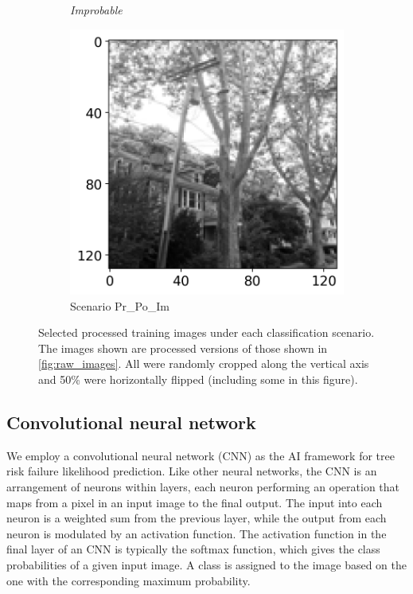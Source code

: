\documentclass[NewProceedindgs, NoLineNumbers, SectionNumbers, letterpaper, SingleSpace, InsideFigs]{ascelike-new}
\begin{document}
\begin{figure}[h!]
\begin{subfigure}[b]{.24\linewidth}
    \textit{\footnotesize Improbable}
    
    \includegraphics[width=\textwidth]{processed-improbable-example-2-flipped}
    \caption{Scenario Pr\_Po\_Im}
    \label{pr_po_im_64}
  \end{subfigure}%
  
  \caption{Selected processed training images under each classification scenario.
    The images shown are processed versions of those shown in \autoref{fig:raw_images}.
    All were randomly cropped along the vertical axis and 50\% were horizontally flipped (including some in this figure).
  }
  \label{fig:processed_images}
\end{figure}

\subsection{Convolutional neural network}
We employ a convolutional neural network (CNN) as the AI framework for tree risk failure likelihood prediction.  Like
other neural networks, the CNN is an arrangement of neurons within layers, each neuron performing an operation that maps
from a pixel in an input image to the final output.  The input into each neuron is a weighted sum from the previous
layer, while the output from each neuron is modulated by an activation function.  The activation function in the final
layer of an CNN is typically the softmax function, which gives the class probabilities of a given input image.  A class
is assigned to the image based on the one with the corresponding maximum probability.
\end{document}
